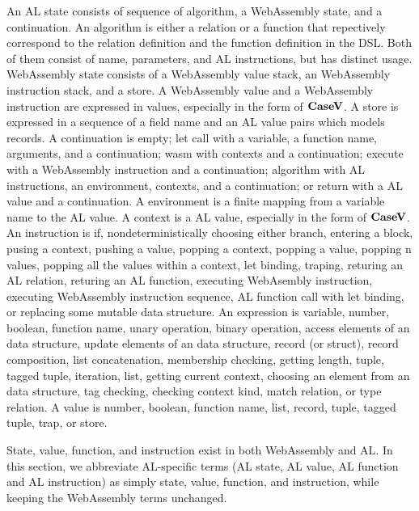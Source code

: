 An AL state consists of sequence of algorithm, a WebAssembly state, and a
continuation.
An algorithm is either a relation or a function that repectively correspond to
the relation definition and the function definition in the DSL.
Both of them consist of name, parameters, and AL instructions, but has distinct
usage.
WebAssembly state consists of a WebAssembly value stack, an WebAssembly
instruction stack, and a store.
A WebAssembly value and a WebAssembly instruction are expressed in values,
especially in the form of $\textbf{CaseV}$.
A store is expressed in a sequence of a field name and an AL value pairs which
models records.
A continuation is empty; let call with a variable, a function name, arguments,
and a continuation; wasm with contexts and a continuation; execute with a
WebAssembly instruction and a continuation; algorithm with AL instructions, an
environment, contexts, and a continuation; or return with a AL value and a
continuation.
A environment is a finite mapping from a variable name to the AL value.
A context is a AL value, especially in the form of $\textbf{CaseV}$.
An instruction is if, nondeterministically choosing either branch, entering a
block, pusing a context, pushing a value, popping a context, popping a value,
popping n values, popping all the values within a context, let binding,
traping, returing an AL relation, returing an AL function, executing WebAsembly
instruction, executing WebAssembly instruction sequence, AL function call with
let binding, or replacing some mutable data structure.
An expression is variable, number, boolean, function name, unary operation,
binary operation, access elements of an data structure, update elements of an
data structure, record (or struct), record composition, list concatenation,
membership checking, getting length, tuple, tagged tuple, iteration, list,
getting current context, choosing an element from an data structure, tag
checking, checking context kind, match relation, or type relation.
A value is number, boolean, function name, list, record, tuple, tagged tuple,
trap, or store.


State, value, function, and instruction exist in both WebAssembly and AL. In
this section, we abbreviate AL-specific terms (AL state, AL value, AL function
and AL instruction) as simply state, value, function, and instruction, while
keeping the WebAssembly terms unchanged.





